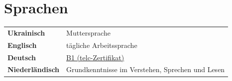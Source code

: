 \documentclass[10pt,a4paper]{article}
\begin{document}
\section*{Sprachen}
\begin{tabularx}{\linewidth}{@{}>{\bfseries}p{4.4cm}X@{}}
Ukrainisch & Muttersprache \\[4pt]
Englisch & tägliche Arbeitssprache \\[4pt]
Deutsch & \href{https://results.telc.net/vb?credential=telc-LcFTx7e}{B1 (telc-Zertifikat)} \\[4pt]
Niederländisch & Grundkenntnisse im Verstehen, Sprechen und Lesen \\
\end{tabularx}
\end{document}
